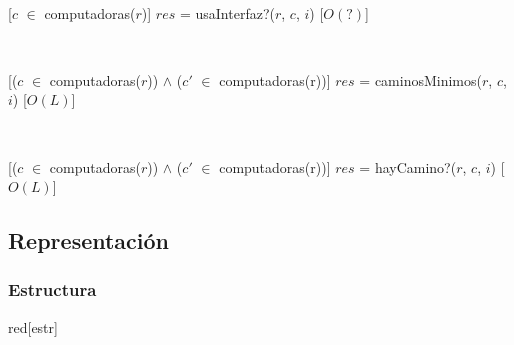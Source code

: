   ~

  [$c$ $\in$ computadoras($r$)]
  {$res$ = usaInterfaz?($r$, $c$, $i$)}
  [$O(?)$]

  ~

  [($c$ $\in$ computadoras($r$)) $\land$ ($c'$ $\in$ computadoras(r))]
  {$res$ = caminosMinimos($r$, $c$, $i$)}
  [$O(L)$]

  ~

  [($c$ $\in$ computadoras($r$)) $\land$ ($c'$ $\in$ computadoras(r))]
  {$res$ = hayCamino?($r$, $c$, $i$)}
  [$O(L)$]


\subsection{Representación}

  \subsubsection{Estructura}

    \begin{Estructura}{red}[estr]

      \begin{Tupla}[estr]
      \end{Tupla}

      ~

      \begin{Tupla}[nodoRed]
      \end{Tupla}


    \end{Estructura}

